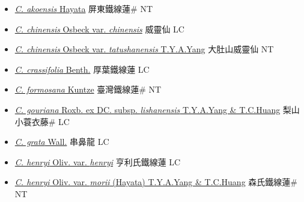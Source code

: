 \begin{itemize}
  \begin{itemize}
        \item[] \href{http://www.theplantlist.org/tpl1.1/search?q=Clematis+akoensis}{\textit{C. akoensis} Hayata}   屏東鐵線蓮\# NT
        \item[] \href{http://www.theplantlist.org/tpl1.1/search?q=Clematis+chinensis+var.+chinensis}{\textit{C. chinensis} Osbeck var. \textit{chinensis}}   威靈仙 LC
        \item[] \href{http://www.theplantlist.org/tpl1.1/search?q=Clematis+chinensis+var.+tatushanensis}{\textit{C. chinensis} Osbeck var. \textit{tatushanensis} T.Y.A.Yang}   大肚山威靈仙 NT
        \item[] \href{http://www.theplantlist.org/tpl1.1/search?q=Clematis+crassifolia}{\textit{C. crassifolia} Benth.}   厚葉鐵線蓮 LC
        \item[] \href{http://www.theplantlist.org/tpl1.1/search?q=Clematis+formosana}{\textit{C. formosana} Kuntze}   臺灣鐵線蓮\# NT
        \item[] \href{http://www.theplantlist.org/tpl1.1/search?q=Clematis+gouriana+subsp.+lishanensis}{\textit{C. gouriana} Roxb. ex DC. subsp. \textit{lishanensis} T.Y.A.Yang \& T.C.Huang}   梨山小蓑衣藤\# LC
        \item[] \href{http://www.theplantlist.org/tpl1.1/search?q=Clematis+grata}{\textit{C. grata} Wall.}   串鼻龍 LC
        \item[] \href{http://www.theplantlist.org/tpl1.1/search?q=Clematis+henryi+var.+henryi}{\textit{C. henryi} Oliv. var. \textit{henryi}}   亨利氏鐵線蓮 LC
        \item[] \href{http://www.theplantlist.org/tpl1.1/search?q=Clematis+henryi+var.+morii}{\textit{C. henryi} Oliv. var. \textit{morii} (Hayata) T.Y.A.Yang \& T.C.Huang}   森氏鐵線蓮\# NT

\end{itemize}
\end{itemize}
